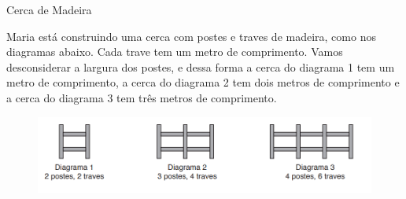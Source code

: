 \documentclass{beamer}
\begin{document}
\begin{frame}{Cerca de Madeira}

Maria está construindo uma cerca com postes e traves de madeira, como nos diagramas abaixo. Cada trave tem um metro de comprimento. Vamos desconsiderar a largura dos postes, e dessa forma a cerca do diagrama 1 tem um metro de comprimento, a cerca do diagrama 2 tem dois metros de comprimento e a cerca do diagrama 3 tem três metros de comprimento.

\begin{figure}[ht]
\centering
\includegraphics[width=.9\textwidth]{diagramas.png}
\label{fig:exampleFig2}
\end{figure}

\end{frame}
\end{document}
